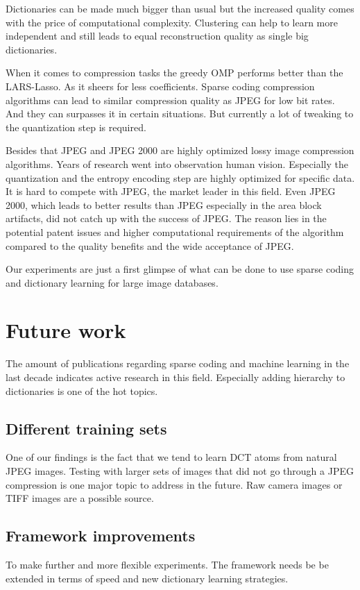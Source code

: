 Dictionaries can be made much bigger than usual but the increased quality
comes with the price of computational complexity. Clustering can help to learn
more independent and still leads to equal reconstruction quality as single big
dictionaries.

When it comes to compression tasks the greedy OMP performs better
than the LARS-Lasso. As it sheers for less coefficients. Sparse coding 
compression algorithms can lead to similar compression quality as JPEG 
for low bit rates. And they can surpasses it in certain situations. But
currently a lot of tweaking to the quantization step is required. 

Besides that JPEG and JPEG 2000 are highly optimized lossy image compression
algorithms. Years of research went into observation human vision. Especially the
quantization and the entropy encoding step are highly optimized for specific
data. It is hard to compete with JPEG, the market leader in this field.  Even
JPEG 2000, which leads to better results than JPEG especially in the area block
artifacts, did not catch up with the success of JPEG. The reason lies in the
potential patent issues and higher computational requirements of the algorithm
compared to the quality benefits and the wide acceptance of JPEG.

Our experiments are just a first glimpse of what can be done to use sparse
coding and dictionary learning for large image databases.

\section{Future work}
The amount of publications regarding sparse coding and machine learning in the
last decade indicates active research in this field. Especially
adding hierarchy to dictionaries is one of the hot topics. 

\subsection{Different training sets}
One of our findings is the fact that we tend to learn DCT atoms from natural
JPEG images. Testing with larger sets of images that did not go through a JPEG
compression is one major topic to address in the future. Raw camera images or
TIFF images are a possible source. 

\subsection{Framework improvements}
To make further and more flexible experiments. The framework needs be be
extended in terms of speed and new dictionary learning strategies.

